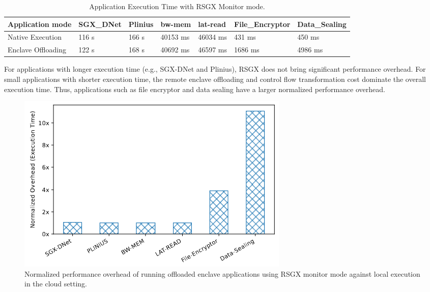 \documentclass[article, doublespace,nopageskip]{VTthesis} %
\newcommand{\monitor}{RSGX \xspace}
\begin{document}
    \begin{table}[t]
    \caption{Application Execution Time with \monitor Monitor mode.}
    \footnotesize
    \centering
    \begin{tabular}{|l|l|l|l|l|l|l|}
        \hline
        Application mode & SGX\_DNet & Plinius & bw-mem & lat-read & File\_Encryptor & Data\_Sealing \\ \hline
        Native Execution   & 116 s & 166 s   & 40153 ms & 46034 ms & 431 ms  & 450 ms      \\ \hline
        Enclave Offloading & 122 s & 168 s   & 40692 ms & 46597 ms & 1686 ms & 4986 ms     \\ \hline
    \end{tabular}
    \label{tab:exe_time}
    \end{table}

    For applications with longer execution time (e.g., SGX-DNet and Plinius), \monitor does not bring significant performance overhead. For small applications with shorter execution time, the remote enclave offloading and control flow transformation cost dominate the overall execution time. Thus, applications such as file encryptor and data sealing have a larger normalized performance overhead. 

        \begin{figure}[htb]
            \centering
            \includegraphics[scale=2.5]{figures/Normalized_performance.png}
            \caption{ Normalized performance overhead of running offloaded enclave applications using \monitor monitor mode against local execution in the cloud setting.} 
            \label{fig:normalized_perf}
        \end{figure}
\end{document}
